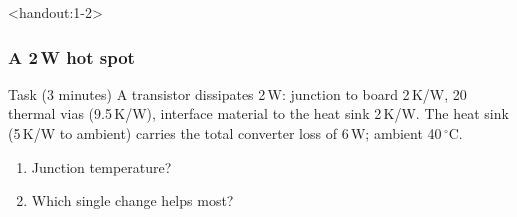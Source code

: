 \begin{frame}<handout:1-2>
	\frametitle{A 2\,W hot spot}
	\begin{block}{Task (3 minutes)}
		A transistor dissipates 2\,W: junction to board 2\,K/W, 20 thermal vias (9.5\,K/W), interface material to the heat sink 2\,K/W. The heat sink (5\,K/W to ambient) carries the total converter loss of 6\,W; ambient 40\,$^\circ$C.
		\begin{enumerate}
			\item Junction temperature?
			\item Which single change helps most?
		\end{enumerate}
	\end{block}
\end{frame}

